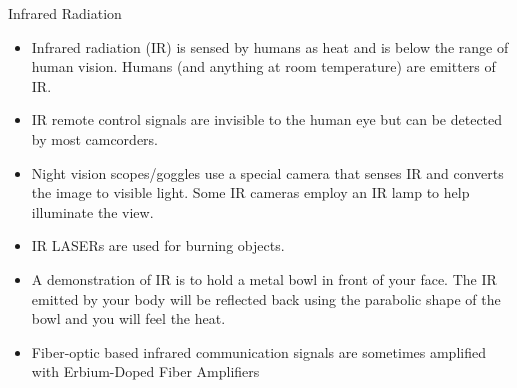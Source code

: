 {\Large Infrared Radiation}
\begin{itemize}

\item Infrared radiation (IR) is sensed by humans as heat and is below the range of human vision. Humans (and anything at room temperature) are emitters of IR.

\item IR remote control signals are invisible to the human eye but can be detected by most camcorders.

\item Night vision scopes/goggles use a special camera that senses IR and converts the image to visible light. Some IR cameras employ an IR lamp to help illuminate the view.

\item IR LASERs are used for burning objects.

\item A demonstration of IR is to hold a metal bowl in front of your face. The IR emitted by your body  will be reflected back using the parabolic shape of the bowl and you will feel the heat.

\item Fiber-optic based infrared communication signals are sometimes amplified with Erbium-Doped Fiber Amplifiers  
\end{itemize}
